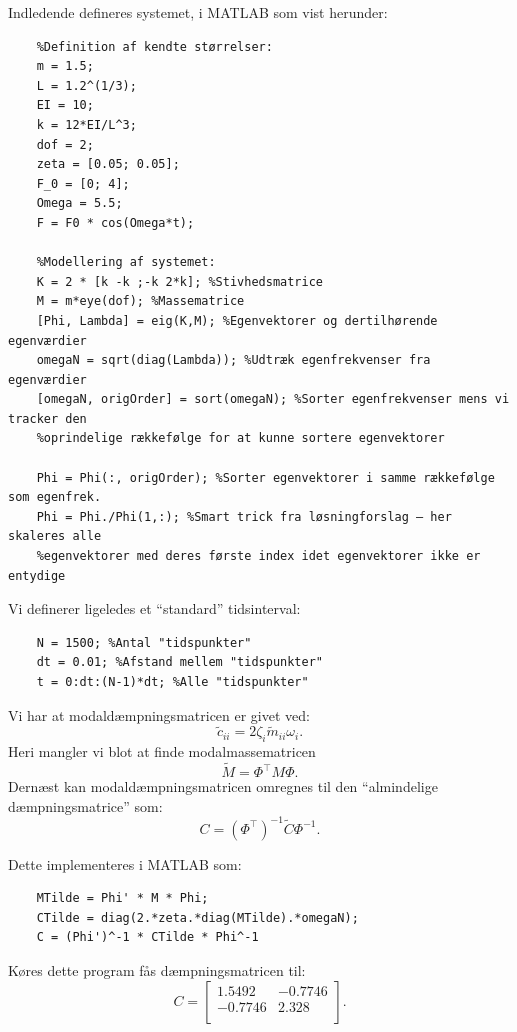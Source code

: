\begin{derivation}
  Indledende defineres systemet, i MATLAB som vist herunder:
  \begin{verbatim}
    %Definition af kendte størrelser:
    m = 1.5;
    L = 1.2^(1/3); 
    EI = 10;
    k = 12*EI/L^3;
    dof = 2;
    zeta = [0.05; 0.05];
    F_0 = [0; 4];
    Omega = 5.5;
    F = F0 * cos(Omega*t);

    %Modellering af systemet:
    K = 2 * [k -k ;-k 2*k]; %Stivhedsmatrice
    M = m*eye(dof); %Massematrice
    [Phi, Lambda] = eig(K,M); %Egenvektorer og dertilhørende egenværdier
    omegaN = sqrt(diag(Lambda)); %Udtræk egenfrekvenser fra egenværdier
    [omegaN, origOrder] = sort(omegaN); %Sorter egenfrekvenser mens vi tracker den
    %oprindelige rækkefølge for at kunne sortere egenvektorer

    Phi = Phi(:, origOrder); %Sorter egenvektorer i samme rækkefølge som egenfrek.
    Phi = Phi./Phi(1,:); %Smart trick fra løsningforslag – her skaleres alle 
    %egenvektorer med deres første index idet egenvektorer ikke er entydige
  \end{verbatim}
  Vi definerer ligeledes et ``standard'' tidsinterval:
  \begin{verbatim}
    N = 1500; %Antal "tidspunkter"
    dt = 0.01; %Afstand mellem "tidspunkter"
    t = 0:dt:(N-1)*dt; %Alle "tidspunkter"
  \end{verbatim}

  Vi har at modaldæmpningsmatricen er givet ved:
  \begin{equation*}
    \tilde{c}_{ii} = 2\zeta_i \tilde{m}_{ii} \omega_i
  .\end{equation*}
  Heri mangler vi blot at finde modalmassematricen
  \begin{equation*}
    \tilde{M} = \Phi^{\intercal} M \Phi
  .\end{equation*}
  Dernæst kan modaldæmpningsmatricen omregnes til den ``almindelige dæmpningsmatrice'' som:
  \begin{equation*}
    C = \left( \Phi^{\intercal} \right)^{-1} \tilde{C} \Phi^{-1}
  .\end{equation*}
  
  Dette implementeres i MATLAB som:
  \begin{verbatim}
    MTilde = Phi' * M * Phi;
    CTilde = diag(2.*zeta.*diag(MTilde).*omegaN);
    C = (Phi')^-1 * CTilde * Phi^-1
  \end{verbatim}
  
  Køres dette program fås dæmpningsmatricen til:
  \begin{equation*}
    C = \begin{bmatrix}
      \num{1,5492}  &  \num{-0,7746} \\
      \num{-0,7746} & \num{2,328} \\
    \end{bmatrix}
  .\end{equation*}
  

\end{derivation}
